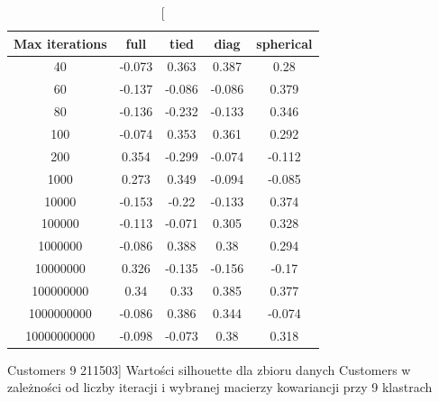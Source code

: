 \documentclass{classrep}
\begin{document}
{{\begin{table}[!htbp]
                \begin{minipage}{1\textwidth}
                \centering
                \begin{tabular}{|c|c|c|c|c|}
                \hline
                Max iterations & full & tied & diag & spherical \\ \hline
                40 & -0.073 & 0.363 & 0.387 & 0.28 \\ \hline
                60 & -0.137 & -0.086 & -0.086 & 0.379 \\ \hline
                80 & -0.136 & -0.232 & -0.133 & 0.346 \\ \hline
                100 & -0.074 & 0.353 & 0.361 & 0.292 \\ \hline
                200 & 0.354 & -0.299 & -0.074 & -0.112 \\ \hline
                1000 & 0.273 & 0.349 & -0.094 & -0.085 \\ \hline
                10000 & -0.153 & -0.22 & -0.133 & 0.374 \\ \hline
                100000 & -0.113 & -0.071 & 0.305 & 0.328 \\ \hline
                1000000 & -0.086 & 0.388 & 0.38 & 0.294 \\ \hline
                10000000 & 0.326 & -0.135 & -0.156 & -0.17 \\ \hline
                100000000 & 0.34 & 0.33 & 0.385 & 0.377 \\ \hline
                1000000000 & -0.086 & 0.386 & 0.344 & -0.074 \\ \hline
                10000000000 & -0.098 & -0.073 & 0.38 & 0.318 \\ \hline
                \end{tabular}
                \caption
                [Customers 9 211503]
                {Wartości silhouette dla zbioru danych Customers w zależności od liczby
                iteracji i wybranej macierzy kowariancji przy 9 klastrach}
                \label{Customers_9_211503}
                \end{minipage}
                \hfill
            
            \end{table}
            
}}
\end{document}
